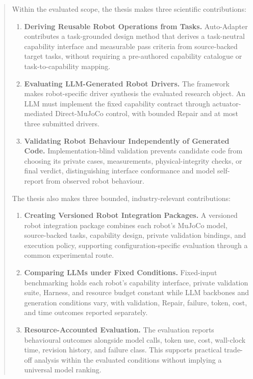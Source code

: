 \begin{abstract}
Within the evaluated scope, the thesis makes three scientific contributions:
\vspace{-\parskip}
\begin{enumerate}[leftmargin=*,labelsep=.8em,nosep]

  \item \textbf{Deriving Reusable Robot Operations from Tasks.}
  Auto-Adapter contributes a task-grounded design method that
  derives a task-neutral capability interface and measurable pass criteria from
  source-backed target tasks, without requiring a pre-authored capability
  catalogue or task-to-capability mapping.

  \item \textbf{Evaluating LLM-Generated Robot Drivers.}
  The framework makes robot-specific driver synthesis the
  evaluated research object. An LLM must implement the fixed capability contract
  through actuator-mediated Direct-MuJoCo control, with bounded Repair and at
  most three submitted drivers.

  \item \textbf{Validating Robot Behaviour Independently of Generated Code.}
  Implementation-blind validation prevents candidate code from
  choosing its private cases, measurements, physical-integrity checks, or final
  verdict, distinguishing interface conformance and model self-report from
  observed robot behaviour.

\end{enumerate}

The thesis also makes three bounded,
industry-relevant contributions:
\vspace{-\parskip}
\begin{enumerate}[leftmargin=*,labelsep=.8em,nosep]

  \item \textbf{Creating Versioned Robot Integration Packages.}
  A versioned robot integration package combines each robot's
  MuJoCo model, source-backed tasks, capability design, private validation
  bindings, and execution policy, supporting configuration-specific evaluation
  through a common experimental route.

  \item \textbf{Comparing LLMs under Fixed Conditions.}
  Fixed-input benchmarking holds each robot's capability
  interface, private validation suite, Harness, and resource budget constant
  while LLM backbones and generation conditions vary, with validation, Repair,
  failure, token, cost, and time outcomes reported separately.

  \item \textbf{Resource-Accounted Evaluation.}
  The evaluation reports behavioural outcomes alongside model calls, token use,
  cost, wall-clock time, revision history, and failure class. This supports
  practical trade-off analysis within the evaluated conditions without implying
  a universal model ranking.

\end{enumerate}

\end{abstract}

